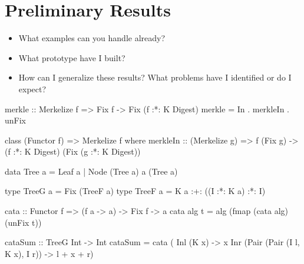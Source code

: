 \section{Preliminary Results}
\begin{itemize}
    \item What examples can you handle already?
    \item What prototype have I built?
    \item How can I generalize these results? What problems have I identified or do I expect?
\end{itemize}

\begin{haskell}
merkle :: Merkelize f => Fix f -> Fix (f :*: K Digest)
merkle = In . merkleIn . unFix
\end{haskell}

\begin{haskell}
class (Functor f) => Merkelize f where
  merkleIn :: (Merkelize g) 
           => f (Fix g) -> (f :*: K Digest) (Fix (g :*: K Digest))
\end{haskell}

\begin{haskell}
data Tree a = Leaf a
            | Node (Tree a) a (Tree a)

type TreeG a = Fix (TreeF a)
type TreeF a = K a
            :+: ((I :*: K a) :*: I)
\end{haskell}

\begin{haskell}
cata :: Functor f => (f a -> a) -> Fix f -> a
cata alg t = alg (fmap (cata alg) (unFix t)) 
\end{haskell}

\begin{haskell}
cataSum :: TreeG Int -> Int
cataSum = cata (\case
  Inl (K x)                         -> x
  Inr (Pair (Pair (I l, K x), I r)) -> l + x + r)
\end{haskell}